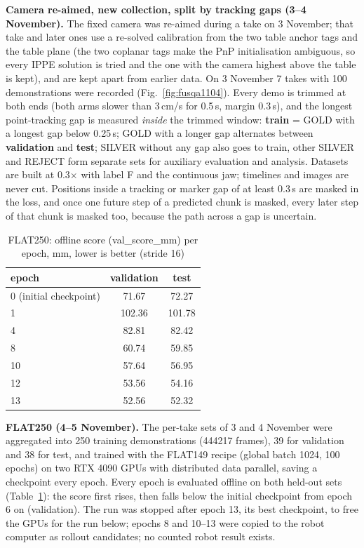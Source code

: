 \documentclass[conference,10pt]{IEEEtran}
\begin{document}
\textbf{Camera re-aimed, new collection, split by tracking gaps (3--4 November).} The fixed camera was re-aimed during a
take on 3 November; that take and later ones use a re-solved calibration from the two table anchor tags and the table
plane (the two coplanar tags make the PnP initialisation ambiguous, so every IPPE solution is tried and the one with the
camera highest above the table is kept), and are kept apart from earlier data. On 3 November 7 takes with 100
demonstrations were recorded (Fig.~\ref{fig:fusqa1104}). Every demo is trimmed at both ends (both arms slower than
3\,cm/s for 0.5\,s, margin 0.3\,s), and the longest point-tracking gap is measured \emph{inside} the trimmed window:
\textbf{train} = GOLD with a longest gap below 0.25\,s; GOLD with a longer gap alternates between \textbf{validation}
and \textbf{test}; SILVER without any gap also goes to train, other SILVER and REJECT form separate sets for auxiliary
evaluation and analysis. Datasets are built at
0.3$\times$ with label F and the continuous jaw; timelines and images are never cut. Positions inside a tracking or marker
gap of at least 0.3\,s are masked in the loss, and once one future step of a predicted chunk is masked, every later step
of that chunk is masked too, because the path across a gap is uncertain.

\begin{table}[t]
\caption{FLAT250: offline score (val\_score\_mm) per epoch, mm, lower is better (stride 16)}\label{tab:flat250}
\centering\small
\begin{tabular}{@{}lcc@{}}
\toprule
epoch & validation & test \\
\midrule
0 (initial checkpoint) & 71.67 & 72.27 \\
1 & 102.36 & 101.78 \\
4 & 82.81 & 82.42 \\
8 & 60.74 & 59.85 \\
10 & 57.64 & 56.95 \\
12 & 53.56 & 54.16 \\
13 & 52.56 & 52.32 \\
\bottomrule
\end{tabular}
\end{table}

\textbf{FLAT250 (4--5 November).} The per-take sets of 3 and 4 November were aggregated into 250 training demonstrations
(444217 frames), 39 for validation and 38 for test, and trained with the FLAT149 recipe (global batch 1024, 100 epochs)
on two RTX 4090 GPUs with distributed data parallel, saving a checkpoint every epoch. Every epoch is evaluated offline on
both held-out sets (Table~\ref{tab:flat250}): the score first rises, then falls below the initial checkpoint from
epoch 6 on (validation). The run was stopped after epoch 13, its best checkpoint, to free the GPUs for the run below;
epochs 8 and 10--13 were copied to the robot computer as rollout candidates; no counted robot result exists.
\end{document}
